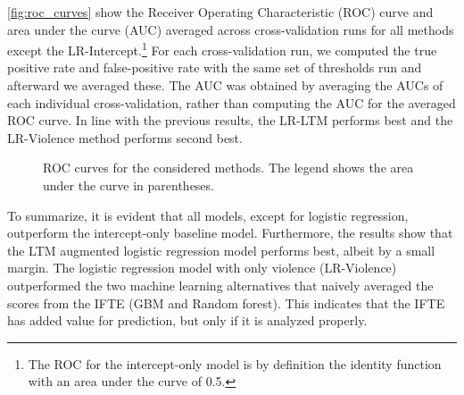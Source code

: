 \documentclass[a4paper,11pt]{article}
\begin{document}
\autoref{fig:roc_curves} show the Receiver Operating Characteristic (ROC) curve and area under the curve (AUC) averaged across cross-validation runs for all methods except the LR-Intercept.\footnote{The ROC for the intercept-only model is by definition the identity function with an area under the curve of 0.5.}
For each cross-validation run, we computed the true positive rate and false-positive rate with the same set of thresholds run and afterward we averaged these.
The AUC was obtained by averaging the AUCs of each individual cross-validation, rather than computing the AUC for the averaged ROC curve.
In line with the previous results, the LR-LTM performs best and the LR-Violence method performs second best.

\begin{figure}[!ht]
    \centering
    
    \caption{ROC curves for the considered methods. The legend shows the area under the curve in parentheses.}
    \label{fig:roc_curves}
\end{figure}

To summarize, it is evident that all models, except for logistic regression, outperform the intercept-only baseline model.
Furthermore, the results show that the LTM augmented logistic regression model performs best, albeit by a small margin.
The logistic regression model with only violence (LR-Violence) outperformed the two machine learning alternatives that naively averaged the scores from the IFTE (GBM and Random forest).
This indicates that the IFTE has added value for prediction, but only if it is analyzed properly.
\end{document}
